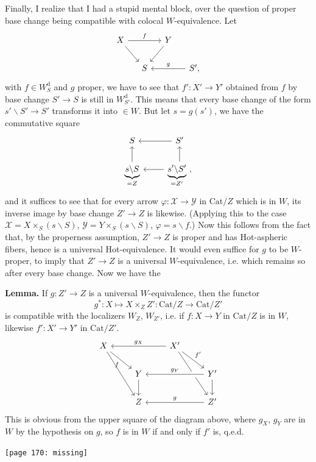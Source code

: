 \documentclass[11pt]{article}
\newcommand{\printedpage}[1]{\marginpar{\footnotesize p.~#1}}
\newcommand{\msp}[1]{\marginpar{\footnotesize [#1]}}
\newcommand{\Cat}{\mathrm{Cat}}
\newcommand{\bs}{\backslash}
\begin{document}
\noindent\printedpage{103}%
\msp{page 168}Finally, I realize that I had a stupid mental block, over the question of proper base change being compatible with colocal $W$-equivalence. Let
\[
\begin{tikzcd}[column sep=small]
X \arrow[rr, "f"] \arrow[dr] & & Y \arrow[dl] & \\
& S & & S', \arrow[ll, "g"']
\end{tikzcd}
\]
with $f \in W^{\mathrm{d}}_{S}$ and $g$ proper, we have to see that $f' : X' \longrightarrow Y'$ obtained from $f$ by base change $S' \longrightarrow S$ is still in $W^{\mathrm{d}}_{S'}$. This means that every base change of the form $s'\bs S' \longrightarrow S'$ transforms it into $\in W$. But let $s = g(s')$, we have the commutative square
\[
\begin{tikzcd}
S & S' \arrow[l] \\
\underbrace{s\bs S}_{= Z} \arrow[u] & \underbrace{s'\bs S'}_{= Z'} \arrow[l] \arrow[u] \ ,
\end{tikzcd}
\]
and it suffices to see that for every arrow $\varphi : \mathcal{X} \longrightarrow \mathcal{Y}$ in $\Cat/Z$ which is in $W$, its inverse image by base change $Z' \longrightarrow Z$ is likewise. (Applying this to the case $\mathcal{X} = X \times_S (s\bs S)$, $\mathcal{Y} = Y \times_S (s\bs S)$, $\varphi = s\bs f$.) Now this follows from the fact that, by \msp{page 169}the properness assumption, $Z' \longrightarrow Z$ is proper and has Hot-aspheric fibers, hence is a universal Hot-equivalence. It would even suffice for $g$ to be $W$-proper, to imply that $Z' \longrightarrow Z$ is a universal $W$-equivalence, i.e. which remains so after every base change. Now we have the

\noindent\textbf{Lemma.} If $g : Z' \longrightarrow Z$ is a universal $W$-equivalence, then the functor
\[
g^* : X \longmapsto X \times_Z Z' : \Cat/Z \longrightarrow \Cat/Z'
\]
is compatible with the localizers $W_Z$, $W_{Z'}$, i.e. if $f : X \longrightarrow Y$ in $\Cat/Z$ is in $W$, likewise $f' : X' \longrightarrow Y'$ in $\Cat/Z'$.
\[
\begin{tikzcd}
X \arrow[dr, "f"'] \arrow[ddr] & & X' \arrow[ll, "g_X"'] \arrow[dr, "f'"] \arrow[ddr] & \\
& Y \arrow[d] & & Y' \arrow[ll, "g_Y"', crossing over] \arrow[d] \\
& Z & & Z' \arrow[ll, "g"']
\end{tikzcd}
\]
This is obvious from the upper square of the diagram above, where $g_X$, $g_Y$ are in $W$ by the hypothesis on $g$, so $f$ is in $W$ if and only if $f'$ is, q.e.d. %

\msp{page 170: missing}\texttt{[page 170: missing]}
\end{document}
